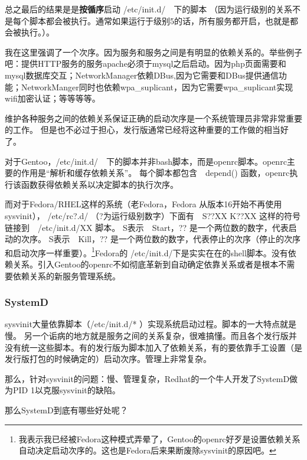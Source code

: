 \documentclass[amstex,twoside]{ctexbook}
\begin{document}
总之最后的结果是是\textbf{按循序}启动 /etc/init.d/　下的脚本
（因为运行级别的关系不是每个脚本都会被执行。通常如果运行于级别5的话，所有服务都开启，也就是都会被执行。）。

我在这里强调了一个次序。因为服务和服务之间是有明显的依赖关系的。举些例子吧：提供HTTP服务的服务apache必须于mysql之后启动。因为php页面需要和mysql数据库交互；NetworkManager依赖DBus,因为它需要和DBus提供通信功能；NetworkManger同时也依赖wpa\_suplicant，因为它需要wpa\_suplicant实现wifi加密认证；等等等等。

维护各种服务之间的依赖关系保证正确的启动次序是一个系统管理员非常非常重要的工作。
但是也不必过于担心，发行版通常已经将这种重要的工作做的相当好了。

对于Gentoo，/etc/init.d/　下的脚本并非bash脚本，而是openrc脚本。openrc主要的作用是“解析和缓存依赖关系”。
每个脚本都包含　depend() 函数，openrc执行该函数获得依赖关系以决定脚本的执行次序。

而对于Fedora/RHEL这样的系统（老Fedora，Fedora 从版本16开始不再使用sysvinit）， /etc/rc?.d/ （?为运行级别数字）下面有　S??XX K??XX 这样的符号链接到　/etc/init.d/XX 脚本。 %
S表示　Start，?? 是一个两位数的数字，代表启动的次序。
S表示　Kill，?? 是一个两位数的数字，代表停止的次序（停止的次序和启动次序一样重要）。\footnote{
我表示我已经被Fedora这种模式弄晕了，Gentoo的openrc好歹是设置依赖关系自动决定启动次序的。这也是Fedora后来果断废除sysvinit的原因吧。}Fedora的 /etc/init.d/下是实实在在的shell脚本。没有依赖关系。引入Gentoo的openrc不如彻底革新到自动确定依靠关系或者是根本不需要依赖关系的新服务管理系统。

\subsubsection{SystemD}
sysvinit大量依靠脚本（/etc/init.d/* ）实现系统启动过程。脚本的一大特点就是慢。
另一个诟病的地方就是服务之间的关系复杂，很难搞懂。而且各个发行版并没有统一这些脚本。有的发行版为脚本加入了依赖关系，有的要依靠手工设置（是发行版打包的时候确定的）启动次序。管理上非常复杂。

那么，针对sysvinit的问题：慢、管理复杂，Redhat的一个牛人开发了SystemD做为PID 1以克服sysvinit的缺陷。

那么SystemD到底有哪些好处呢？
\end{document}
